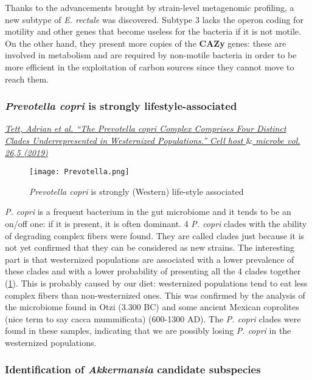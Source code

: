 Thanks to the advancements brought by strain-level metagenomic profiling, a new subtype of \emph{E. rectale} was discovered. Subtype 3 lacks the operon coding for motility and other genes that become useless for the bacteria if it is not motile. On the other hand, they present more copies of the \textbf{CAZy} genes: these are involved in metabolism and are required by non-motile bacteria in order to be more efficient in the exploitation of carbon sources since they cannot move to reach them.

\subsubsection{\emph{Prevotella copri} is strongly lifestyle-associated}

\href{https://www.sciencedirect.com/science/article/pii/S1931312819304275}{\emph{Tett, Adrian et al. “The Prevotella copri Complex Comprises Four Distinct Clades Underrepresented in Westernized Populations.” Cell host $\&$ microbe vol. 26,5 (2019)}}\\

\begin{figure}[!h]
\centering
\texttt{[image: Prevotella.png]}
\caption{\label{fig:prevotella}\emph{Prevotella copri} is strongly (Western) life-style associated}
\end{figure}

\emph{P. copri} is a frequent bacterium in the gut microbiome and it tends to be an on/off one: if it is present, it is often dominant.
4 \emph{P. copri} clades with the ability of degrading complex fibers were found. They are called clades just because it is not yet confirmed that they can be considered as new strains. 
The interesting part is that westernized populations are associated with a lower prevalence of these clades and with a lower probability of presenting all the 4 clades together (\ref{fig:prevotella}). This is probably caused by our diet: westernized populations tend to eat less complex fibers than non-westernized ones.
This was confirmed by the analysis of the microbiome found in Otzi (3.300 BC) and some ancient Mexican coprolites (nice term to say cacca mummificata) (600-1300 AD). The \emph{P. copri} clades were found in these samples, indicating that we are possibly losing \emph{P. copri} in the westernized populations.

\subsubsection{Identification of \emph{Akkermansia} candidate subspecies}

